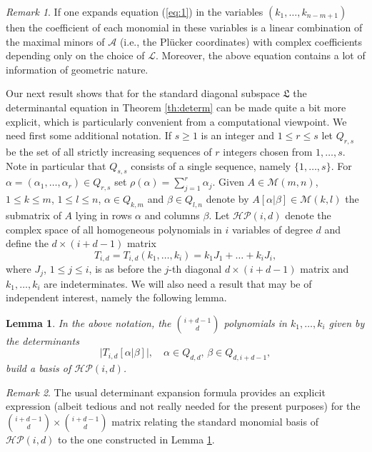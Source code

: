 \documentclass[10pt,twoside,a4paper,reqno]{amsart}
\theoremstyle{plain}
\newtheorem{lemm+}           {Lemma}
\theoremstyle{definition}
\theoremstyle{remark}
\newtheorem{rema+}           {Remark}
\newenvironment{lemma}{\begin{lemm+}}{\end{lemm+}}
\newenvironment{remark}{\begin{rema+}}{\end{rema+}}
\begin{document}
\begin{remark}
If one expands equation (\ref{eq:1}) in the variables $(k_1,\ldots,k_{n-m+1})$ then the coefficient of each monomial in these variables is a linear combination of the maximal minors of ${\mathcal A}$ 
 (i.e., the Pl\"ucker coordinates) with complex coefficients depending only on the choice of ${\mathcal L}$.
Moreover, the above equation contains a lot of information of geometric nature.
\end{remark}

Our next result shows that for the standard diagonal subspace ${\mathfrak L}$ the determinantal equation in Theorem \ref{th:determ} can be made quite a bit more explicit, which is particularly convenient from a computational viewpoint. We need first some additional notation. If $s\ge 1$ is an integer and $1\le r\le s$ let $Q_{r,s}$ be the set of all strictly increasing sequences of $r$ integers chosen from $1,\ldots,s$. Note in particular that $Q_{s,s}$ consists of a single sequence, namely $\{1,\ldots,s\}$. For ${\alpha}=({\alpha}_1,\ldots,{\alpha}_r)\in Q_{r,s}$ set $\rho({\alpha})=\sum_{j=1}^{r}{\alpha}_j$. Given $A\in{\mathcal {M}}(m,n)$, $1\le k\le m$, $1\le l\le n$, ${\alpha}\in Q_{k,m}$ and ${\beta}\in Q_{l,n}$ denote by $A[{\alpha}|{\beta}]\in{\mathcal {M}}(k,l)$ the submatrix of $A$ lying in rows ${\alpha}$ and columns ${\beta}$.
Let ${\mathcal{HP}}(i,d)$ denote the complex space of all homogeneous polynomials in $i$ variables of degree $d$ and define the $d\times (i+d-1)$ matrix
$$T_{i,d}=T_{i,d}(k_1,\ldots,k_i)=k_1J_1+\ldots+k_iJ_i,$$
where $J_j$, $1\le j\le i$, is as before the $j$-th diagonal $d\times (i+d-1)$
matrix and $k_1,\ldots,k_i$ are indeterminates. We will also need a result that may be of independent interest, namely the following lemma.

\begin{lemma}\label{l:top}
In the above notation, the $\binom{i+d-1}{d}$ polynomials in $k_1,\ldots,k_i$ given by the determinants
$$\Big|T_{i,d}[{\alpha}|{\beta}]\Big|,\quad {\alpha}\in Q_{d,d},\,{\beta}\in Q_{d,i+d-1},$$
build a basis of ${\mathcal{HP}}(i,d)$.
\end{lemma}

\begin{remark}
The usual determinant expansion formula provides an explicit expression (albeit tedious and not really needed for the present purposes) for the
$\binom{i+d-1}{d}\times\binom{i+d-1}{d}$ matrix relating the standard monomial basis of ${\mathcal{HP}}(i,d)$ to the one constructed in Lemma \ref{l:top}.
\end{remark}
\end{document}
